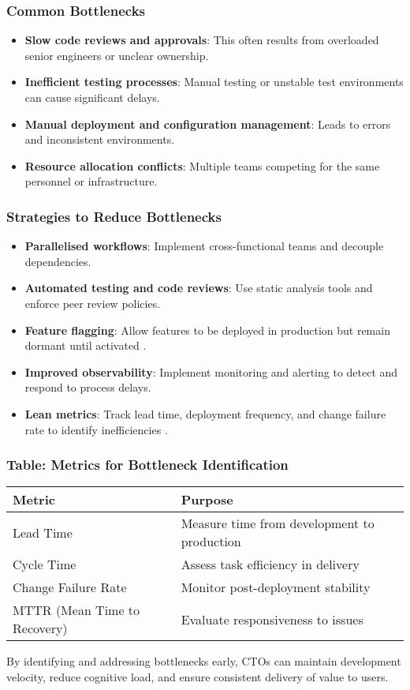 \subsubsection*{Common Bottlenecks}
\begin{itemize}
    \item \textbf{Slow code reviews and approvals}: This often results from overloaded senior engineers or unclear ownership.
    \item \textbf{Inefficient testing processes}: Manual testing or unstable test environments can cause significant delays.
    \item \textbf{Manual deployment and configuration management}: Leads to errors and inconsistent environments.
    \item \textbf{Resource allocation conflicts}: Multiple teams competing for the same personnel or infrastructure.
\end{itemize}

\subsubsection*{Strategies to Reduce Bottlenecks}
\begin{itemize}
    \item \textbf{Parallelised workflows}: Implement cross-functional teams and decouple dependencies.
    \item \textbf{Automated testing and code reviews}: Use static analysis tools and enforce peer review policies.
    \item \textbf{Feature flagging}: Allow features to be deployed in production but remain dormant until activated \cite{rahman2020feature}.
    \item \textbf{Improved observability}: Implement monitoring and alerting to detect and respond to process delays.
    \item \textbf{Lean metrics}: Track lead time, deployment frequency, and change failure rate to identify inefficiencies \cite{forsgren2018accelerate}.
\end{itemize}

\subsubsection*{Table: Metrics for Bottleneck Identification}
\begin{tabular}{|l|l|}
    \hline
    \textbf{Metric}              & \textbf{Purpose}                            \\
    \hline
    Lead Time                    & Measure time from development to production \\
    \hline
    Cycle Time                   & Assess task efficiency in delivery          \\
    \hline
    Change Failure Rate          & Monitor post-deployment stability           \\
    \hline
    MTTR (Mean Time to Recovery) & Evaluate responsiveness to issues           \\
    \hline
\end{tabular}


By identifying and addressing bottlenecks early, CTOs can maintain development velocity, reduce cognitive load, and ensure consistent delivery of value to users.
